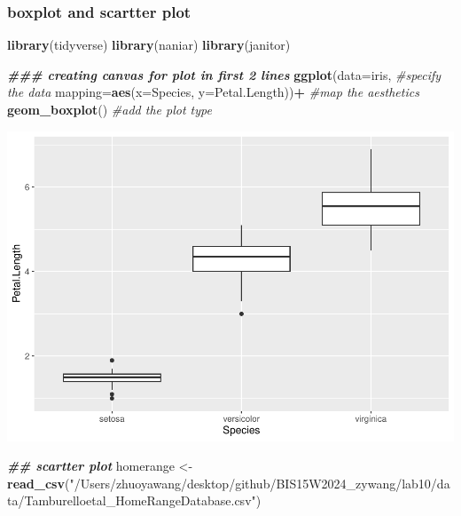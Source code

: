\documentclass[
]{article}
\newenvironment{Shaded}{\begin{snugshade}}{\end{snugshade}}
\newcommand{\AttributeTok}[1]{\textcolor[rgb]{0.13,0.29,0.53}{#1}}
\newcommand{\CommentTok}[1]{\textcolor[rgb]{0.56,0.35,0.01}{\textit{#1}}}
\newcommand{\DocumentationTok}[1]{\textcolor[rgb]{0.56,0.35,0.01}{\textbf{\textit{#1}}}}
\newcommand{\FunctionTok}[1]{\textcolor[rgb]{0.13,0.29,0.53}{\textbf{#1}}}
\newcommand{\NormalTok}[1]{#1}
\newcommand{\OtherTok}[1]{\textcolor[rgb]{0.56,0.35,0.01}{#1}}
\newcommand{\SpecialCharTok}[1]{\textcolor[rgb]{0.81,0.36,0.00}{\textbf{#1}}}
\newcommand{\StringTok}[1]{\textcolor[rgb]{0.31,0.60,0.02}{#1}}
\begin{document}
\hypertarget{boxplot-and-scartter-plot}{%
\subsubsection{boxplot and scartter
plot}\label{boxplot-and-scartter-plot}}

\begin{Shaded}
\begin{Highlighting}[]
\FunctionTok{library}\NormalTok{(tidyverse)}
\FunctionTok{library}\NormalTok{(naniar)}
\FunctionTok{library}\NormalTok{(janitor)}

\DocumentationTok{\#\#\# creating canvas for plot in first 2 lines}
\FunctionTok{ggplot}\NormalTok{(}\AttributeTok{data=}\NormalTok{iris, }\CommentTok{\#specify the data}
       \AttributeTok{mapping=}\FunctionTok{aes}\NormalTok{(}\AttributeTok{x=}\NormalTok{Species, }\AttributeTok{y=}\NormalTok{Petal.Length))}\SpecialCharTok{+} \CommentTok{\#map the aesthetics}
  \FunctionTok{geom\_boxplot}\NormalTok{() }\CommentTok{\#add the plot type}
\end{Highlighting}
\end{Shaded}

\includegraphics{Untitled_files/figure-latex/unnamed-chunk-19-1.pdf}

\begin{Shaded}
\begin{Highlighting}[]
\DocumentationTok{\#\# scartter plot}
\NormalTok{homerange }\OtherTok{\textless{}{-}} \FunctionTok{read\_csv}\NormalTok{(}\StringTok{"/Users/zhuoyawang/desktop/github/BIS15W2024\_zywang/lab10/data/Tamburelloetal\_HomeRangeDatabase.csv"}\NormalTok{)}
\end{Highlighting}
\end{Shaded}
\end{document}
